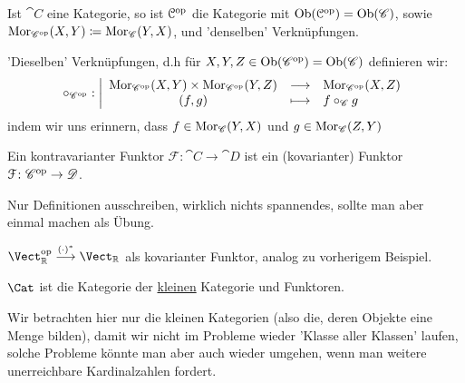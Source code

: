 \begin{definition}[Dualkategorie]\label{def:dualkategorie}
    Ist $\cat{C}$ eine Kategorie, so ist $\mathcal{C}^{\textrm{op}}$ die Kategorie mit $\operatorname{Ob}(\mathcal{C}^{\textrm{op}}) = \operatorname{Ob}(\mathscr{C})$, sowie $\operatorname{Mor}_{\mathscr{C}^{\textrm{op}}}(X,Y) \coloneqq \operatorname{Mor}_{\mathscr{C}}(Y,X)$, und 'denselben' Verknüpfungen.
\end{definition}

\begin{remark*}
    'Dieselben' Verknüpfungen, d.h für $X,Y,Z \in  \operatorname{Ob}(\mathscr{C}^{\textrm{op}}) = \operatorname{Ob}(\mathscr{C})$ definieren wir:
        \begin{equation*}
        \circ _{\mathscr{C}^{\textrm{op}}}: \left| \begin{array}{c c l} 
            \operatorname{Mor}_{\mathscr{C}^{\textrm{op}}}(X,Y) \times  \operatorname{Mor}_{\mathscr{C}^{\textrm{op}}}(Y,Z) & \longrightarrow & \operatorname{Mor}_{\mathscr{C}^{\textrm{op}}}(X,Z) \\
            (f,g) & \longmapsto &  f \circ _{\mathscr{C}} g
        \end{array} \right.
    \end{equation*}
    indem wir uns erinnern, dass $f \in \operatorname{Mor}_{\mathscr{C}}(Y,X)$ und $g\in \operatorname{Mor}_{\mathscr{C}}(Z,Y)$
\end{remark*}

\begin{lemma}\label{lm:kovariante-funktoren-sind-funktoren-von-der-dualen-kategorie}
    Ein kontravarianter Funktor $\mathcal{F}\colon \cat{C} \to  \cat{D}$ ist ein (kovarianter) Funktor $\mathcal{F}\colon  \mathscr{C}^{\textrm{op}} \to  \mathscr{D}$.
\end{lemma}
\begin{proof*}
    Nur Definitionen ausschreiben, wirklich nichts spannendes, sollte man aber einmal machen als Übung.
\end{proof*}

\begin{example}
$\Vect_{\R}^{\op} \stackrel{(\cdot )^*}{\longrightarrow} \Vect_{\R}$ als kovarianter Funktor, analog zu vorherigem Beispiel.
\end{example}

\begin{example}
    $\Cat$ ist die Kategorie der  \underline{kleinen} Kategorie und Funktoren. 
\end{example}

\begin{oral}
    Wir betrachten hier nur die kleinen Kategorien (also die, deren Objekte eine Menge bilden), damit wir nicht im Probleme wieder 'Klasse aller Klassen' laufen, solche Probleme könnte man aber auch wieder umgehen, wenn man weitere unerreichbare Kardinalzahlen fordert.
\end{oral}

